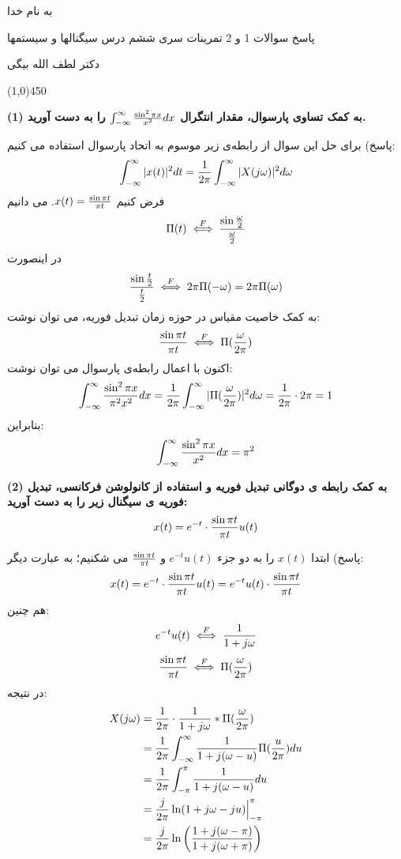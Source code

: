 \documentclass[50pt]{article}
\newcommand{\hl}{
\begin{center}
\line(1,0){450}
\end{center}}
\begin{document}
\setLTR 




\begin{RTL}
\Large{








\begin{center}
به نام خدا

پاسخ سوالات 1 و 2 تمرینات سری ششم درس سیگنالها و سیستمها

دکتر لطف الله بیگی
\end{center}

\hl
\textbf{(1) به کمک تساوی پارسوال، مقدار انتگرال 
$\int_{-\infty}^{\infty}{\sin^2\pi x\over x^2}dx$
 را  به دست آورید.}

پاسخ) برای حل این سوال از رابطه‌ی زیر موسوم به اتحاد پارسوال استفاده می کنیم:
$$
\int_{-\infty}^{\infty}|x(t)|^2 dt={1\over 2\pi}\int_{-\infty}^{\infty}|X(j\omega)|^2 d\omega
$$
فرض کنیم 
$x(t)={\sin \pi t\over \pi t}$. 
می دانیم
$$
\Pi(t)\overset{F}{\iff}{\sin {\omega\over 2}\over {\omega\over 2}}
$$
در اینصورت
$$
{\sin {t\over 2}\over {t\over 2}}\overset{F}{\iff}2\pi\Pi(-\omega)=2\pi\Pi(\omega)
$$
به کمک خاصیت مقیاس در حوزه زمان تبدیل فوریه، می توان نوشت:
$$
{\sin {\pi t}\over {\pi t}}\overset{F}{\iff}\Pi({\omega\over 2\pi})
$$
اکنون با اعمال رابطه‌ی پارسوال می توان نوشت:
\[
\int_{-\infty}^{\infty}{\sin^2\pi x\over \pi^2x^2}dx={1\over 2\pi}\int_{-\infty}^{\infty}|\Pi({\omega\over 2\pi})|^2 d\omega={1\over 2\pi}\cdot 2\pi =1
\]
بنابراین:
\[
\int_{-\infty}^{\infty}{\sin^2\pi x\over x^2}dx=\pi^2
\]






\textbf{(2) به کمک رابطه ی دوگانی تبدیل فوریه و استفاده از کانولوشن فرکانسی، تبدیل فوریه ی سیگنال زیر را به دست آورید:
}$$x(t)=e^{-t}\cdot{\sin \pi t\over \pi t}u(t)$$

پاسخ) ابتدا $x(t)$ را به دو جزء $e^{-t}u(t)$ و ${\sin \pi t\over \pi t}$ می شکنیم؛ به عبارت دیگر:
$$
x(t)=e^{-t}\cdot{\sin \pi t\over \pi t}u(t)=e^{-t}u(t)\cdot {\sin \pi t\over \pi t}
$$
هم چنین:
$$
e^{-t}u(t)\overset{F}{\iff}{1\over 1+j\omega}
$$
$$
{\sin \pi t\over \pi t}\overset{F}{\iff}\Pi({\omega\over 2\pi})
$$
در نتیجه:
\[
\begin{split}
X(j\omega)&={1\over 2\pi}\cdot{1\over 1+j\omega}*\Pi({\omega\over 2\pi})
\\&={1\over 2\pi}\int_{-\infty}^{\infty}{1\over 1+j(\omega-u)}\Pi({u\over 2\pi})du
\\&={1\over 2\pi}\int_{-\pi}^{\pi}{1\over 1+j(\omega-u)}du
\\&={j\over 2\pi}\ln({1+j\omega-ju})\Big|_{-\pi}^\pi
\\&={j\over 2\pi}\ln\left({1+j(\omega-\pi)\over 1+j(\omega+\pi)}\right)
\end{split}
\]

}





\end{RTL}
\end{document}
